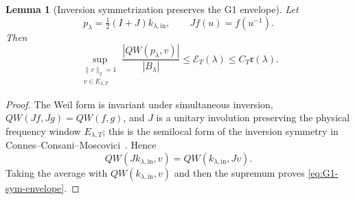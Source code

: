 \documentclass[11pt]{article}
\newtheorem{lemma}[theorem]{Lemma}
\theoremstyle{remark}
\begin{document}
\begin{lemma}[Inversion symmetrization preserves the G1 envelope]\label{lem:g1-inversion}
Let
\[
 p_\lambda=\tfrac12(I+J)k_{\lambda,\mathrm{in}},
 \qquad Jf(u)=f(u^{-1}).
\]
Then
\begin{equation}\label{eq:G1-sym-envelope}
 \sup_{\substack{\|v\|_2=1\\v\in E_{\lambda,T}}}
 \frac{|QW(p_\lambda,v)|}{|B_\lambda|}
 \le \mathcal E_T(\lambda)
 \le C_T\mathfrak r(\lambda).
\end{equation}
\end{lemma}
\begin{proof}
The Weil form is invariant under simultaneous inversion,
$QW(Jf,Jg)=QW(f,g)$, and $J$ is a unitary involution preserving the physical
frequency window $E_{\lambda,T}$; this is the semilocal form of the inversion
symmetry in Connes--Consani--Moscovici~\cite{ConnesConsaniMoscovici2025}.
Hence
\[
 QW(Jk_{\lambda,\mathrm{in}},v)
 =QW(k_{\lambda,\mathrm{in}},Jv).
\]
Taking the average with $QW(k_{\lambda,\mathrm{in}},v)$ and then the supremum
proves \eqref{eq:G1-sym-envelope}.
\end{proof}
\end{document}
